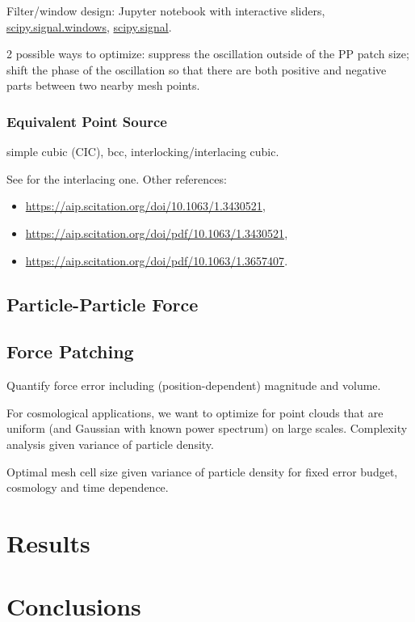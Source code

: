 \documentclass[a4paper]{article}
\newcommand{\YL}[1]{\textcolor{Bittersweet}{#1}}
\begin{document}
\YL{Filter/window design: Jupyter notebook with interactive sliders,
\href{https://docs.scipy.org/doc/scipy/reference/signal.windows.html}{scipy.signal.windows},
\href{https://docs.scipy.org/doc/scipy/reference/signal.html}{scipy.signal}.
}


\YL{2 possible ways to optimize:
suppress the oscillation outside of the PP patch size;
shift the phase of the oscillation so that there are both positive and
negative parts between two nearby mesh points.
}


\subsubsection{Equivalent Point Source}

simple cubic (CIC), bcc, interlocking/interlacing cubic.
\YL{See \citet{HockneyEastwood1988} for the interlacing one.
Other references:
\begin{itemize}
\item \url{https://aip.scitation.org/doi/10.1063/1.3430521},
\item \url{https://aip.scitation.org/doi/pdf/10.1063/1.3430521},
\item \url{https://aip.scitation.org/doi/pdf/10.1063/1.3657407}.
\end{itemize}
}



\subsection{Particle-Particle Force}



\subsection{Force Patching}


\YL{Quantify force error including (position-dependent) magnitude and
volume.}


For cosmological applications, we want to optimize for point clouds that
are uniform (and Gaussian with known power spectrum) on large scales.
\YL{Complexity analysis given variance of particle density.}


\YL{Optimal mesh cell size given variance of particle density for fixed
error budget, cosmology and time dependence.}




\section{Results}


\section{Conclusions}








\end{document}
